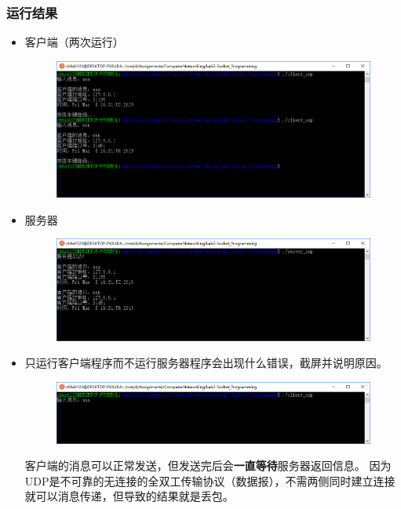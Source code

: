 \documentclass[logo,reportComp]{thesis}
\begin{document}
\subsubsection{运行结果}
\begin{itemize}
\item 客户端（两次运行）
\begin{figure}[H]
\centering
\includegraphics[width=0.8\linewidth]{fig/udp-client.PNG}
\end{figure}
\item 服务器
\begin{figure}[H]
\centering
\includegraphics[width=0.8\linewidth]{fig/udp-server.PNG}
\end{figure}
\item 只运行客户端程序而不运行服务器程序会出现什么错误，截屏并说明原因。
\begin{figure}[H]
\centering
\includegraphics[width=0.8\linewidth]{fig/udp-client-error.PNG}
\end{figure}
客户端的消息可以正常发送，但发送完后会\textbf{一直等待}服务器返回信息。
因为UDP是不可靠的无连接的全双工传输协议（数据报），不需两侧同时建立连接就可以消息传递，但导致的结果就是丢包。
\end{itemize}
\end{document}
